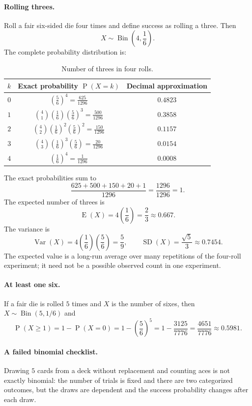 \documentclass[11pt]{article}
\newcommand{\Pp}{\operatorname{P}}
\newcommand{\E}{\operatorname{E}}
\newcommand{\Var}{\operatorname{Var}}
\newcommand{\SD}{\operatorname{SD}}
\newcommand{\Bin}{\operatorname{Bin}}
\begin{document}
\paragraph{Rolling threes.} Roll a fair six-sided die four times and define
success as rolling a three.  Then
\[
X\sim\Bin\left(4,\frac16\right).
\]
The complete probability distribution is:
\begin{table}[ht]
\centering
\caption{Number of threes in four rolls.}\label{tab:binomial}
\begin{tabular}{@{}ccc@{}}
\toprule
$k$ & Exact probability $\Pp(X=k)$ & Decimal approximation \\
\midrule
$0$ & $\left(\frac56\right)^4=\frac{625}{1296}$ & $0.4823$ \\
$1$ & $\binom41\left(\frac16\right)\left(\frac56\right)^3=\frac{500}{1296}$ & $0.3858$ \\
$2$ & $\binom42\left(\frac16\right)^2\left(\frac56\right)^2=\frac{150}{1296}$ & $0.1157$ \\
$3$ & $\binom43\left(\frac16\right)^3\left(\frac56\right)=\frac{20}{1296}$ & $0.0154$ \\
$4$ & $\left(\frac16\right)^4=\frac{1}{1296}$ & $0.0008$ \\
\bottomrule
\end{tabular}
\end{table}
The exact probabilities sum to
\[
\frac{625+500+150+20+1}{1296}=\frac{1296}{1296}=1.
\]
The expected number of threes is
\[
\E(X)=4\left(\frac16\right)=\frac23\approx0.667.
\]
The variance is
\[
\Var(X)=4\left(\frac16\right)\left(\frac56\right)=\frac{5}{9},
\qquad \SD(X)=\frac{\sqrt5}{3}\approx0.7454.
\]
The expected value is a long-run average over many repetitions of the four-roll
experiment; it need not be a possible observed count in one experiment.

\paragraph{At least one six.} If a fair die is rolled $5$ times and $X$ is the
number of sixes, then $X\sim\Bin(5,1/6)$ and
\[
\Pp(X\geq1)=1-\Pp(X=0)=1-\left(\frac56\right)^5
=1-\frac{3125}{7776}=\frac{4651}{7776}\approx0.5981.
\]

\paragraph{A failed binomial checklist.} Drawing $5$ cards from a deck without
replacement and counting aces is not exactly binomial: the number of trials is
fixed and there are two categorized outcomes, but the draws are dependent and
the success probability changes after each draw.
\end{document}

